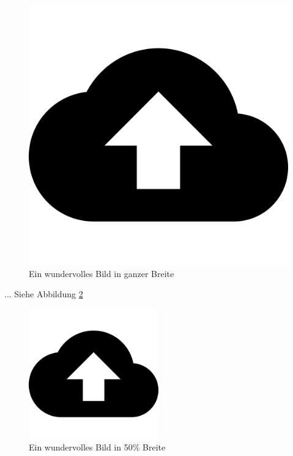 \begin{figure}[h!]
    \centering
    \includegraphics[width=\textwidth]{img/example_image.png}
    \caption{Ein wundervolles Bild in ganzer Breite}
    \label{fig_example}
\end{figure}

... Siehe Abbildung \ref{fig_example_halfsize}

\begin{figure}[h!]
    \centering
    \includegraphics[width=0.5\textwidth]{img/example_image.png}
    \caption[Kurzbeschreibung für Abbildungsverzeichnis]{Ein wundervolles Bild in 50\% Breite}
    \label{fig_example_halfsize}
\end{figure}

